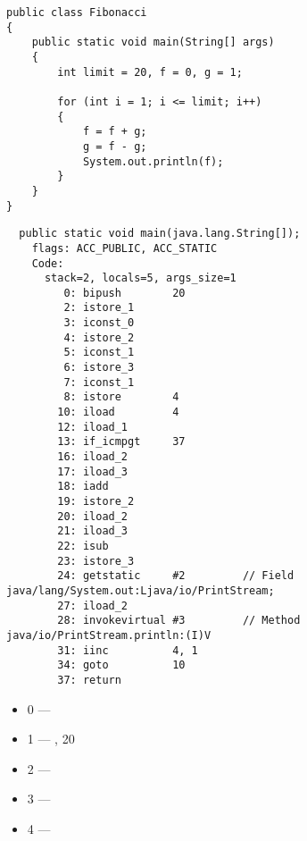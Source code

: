 


\begin{lstlisting}
public class Fibonacci
{
	public static void main(String[] args)
	{ 
		int limit = 20, f = 0, g = 1;

		for (int i = 1; i <= limit; i++)
		{
			f = f + g;
			g = f - g;
			System.out.println(f); 
		}
	}
}
\end{lstlisting}

\begin{lstlisting}
  public static void main(java.lang.String[]);
    flags: ACC_PUBLIC, ACC_STATIC
    Code:
      stack=2, locals=5, args_size=1
         0: bipush        20
         2: istore_1      
         3: iconst_0      
         4: istore_2      
         5: iconst_1      
         6: istore_3      
         7: iconst_1      
         8: istore        4
        10: iload         4
        12: iload_1       
        13: if_icmpgt     37
        16: iload_2       
        17: iload_3       
        18: iadd          
        19: istore_2      
        20: iload_2       
        21: iload_3       
        22: isub          
        23: istore_3      
        24: getstatic     #2         // Field java/lang/System.out:Ljava/io/PrintStream;
        27: iload_2       
        28: invokevirtual #3         // Method java/io/PrintStream.println:(I)V
        31: iinc          4, 1
        34: goto          10
        37: return        
\end{lstlisting}
        

\begin{itemize}
\item 0 --- 
\item 1 --- ,  20
\item 2 --- 
\item 3 --- 
\item 4 --- 
\end{itemize}

